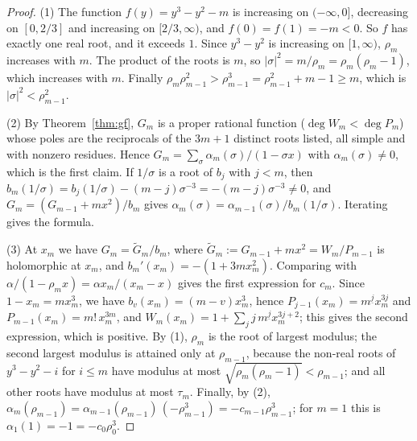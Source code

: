 \documentclass[11pt]{amsart}
\theoremstyle{definition}
\begin{document}
\begin{proof}
(1) The function $f(y)=y^3-y^2-m$ is increasing on $(-\infty,0]$, decreasing on $[0,2/3]$ and increasing on $[2/3,\infty)$, and $f(0)=f(1)=-m<0$. So $f$ has exactly one real root, and it exceeds $1$. Since $y^3-y^2$ is increasing on $[1,\infty)$, $\rho_m$ increases with $m$. The product of the roots is $m$, so $|\sigma|^2=m/\rho_m=\rho_m(\rho_m-1)$, which increases with $m$. Finally $\rho_m\rho_{m-1}^2>\rho_{m-1}^3=\rho_{m-1}^2+m-1\ge m$, which is $|\sigma|^2<\rho_{m-1}^2$.

(2) By Theorem~\ref{thm:gf}, $G_m$ is a proper rational function ($\deg W_m<\deg P_m$) whose poles are the reciprocals of the $3m+1$ distinct roots listed, all simple and with nonzero residues. Hence $G_m=\sum_\sigma\alpha_m(\sigma)/(1-\sigma x)$ with $\alpha_m(\sigma)\ne0$, which is the first claim. If $1/\sigma$ is a root of $b_j$ with $j<m$, then $b_m(1/\sigma)=b_j(1/\sigma)-(m-j)\sigma^{-3}=-(m-j)\sigma^{-3}\ne0$, and $G_m=(G_{m-1}+mx^2)/b_m$ gives $\alpha_m(\sigma)=\alpha_{m-1}(\sigma)/b_m(1/\sigma)$. Iterating gives the formula.

(3) At $x_m$ we have $G_m=\widetilde G_m/b_m$, where $\widetilde G_m:=G_{m-1}+mx^2=W_m/P_{m-1}$ is holomorphic at $x_m$, and $b_m'(x_m)=-(1+3mx_m^2)$. Comparing with $\alpha/(1-\rho_mx)=\alpha x_m/(x_m-x)$ gives the first expression for $c_m$. Since $1-x_m=mx_m^3$, we have $b_v(x_m)=(m-v)x_m^3$, hence $P_{j-1}(x_m)=m^{\underline j}x_m^{3j}$ and $P_{m-1}(x_m)=m!\,x_m^{3m}$, and $W_m(x_m)=1+\sum_jj\,m^{\underline j}x_m^{3j+2}$; this gives the second expression, which is positive. By (1), $\rho_m$ is the root of largest modulus; the second largest modulus is attained only at $\rho_{m-1}$, because the non-real roots of $y^3-y^2-i$ for $i\le m$ have modulus at most $\sqrt{\rho_m(\rho_m-1)}<\rho_{m-1}$; and all other roots have modulus at most $\tau_m$. Finally, by (2), $\alpha_m(\rho_{m-1})=\alpha_{m-1}(\rho_{m-1})\,(-\rho_{m-1}^3)=-c_{m-1}\rho_{m-1}^3$; for $m=1$ this is $\alpha_1(1)=-1=-c_0\rho_0^3$.
\end{proof}
\end{document}
